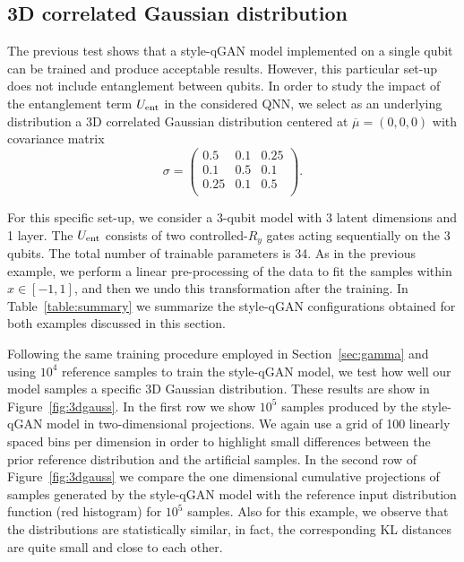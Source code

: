 \documentclass[twocolumn,preprintnumbers,superscriptaddress]{revtex4-2}
\begin{document}
\subsection{3D correlated Gaussian distribution}

The previous test shows that a style-qGAN model implemented on a single qubit can be
trained and produce acceptable results. However, this particular set-up does not
include entanglement between qubits. In order to study the impact of the
entanglement term $U_{\rm ent}$ in the considered QNN, we select as an
underlying distribution a 3D correlated Gaussian distribution centered at
$\overline{\mu}=(0,0,0)$ with covariance matrix
\begin{equation}
\label{eq:covmat}
  \sigma =
\begin{pmatrix}
  0.5 & 0.1 & 0.25\\
  0.1 & 0.5 & 0.1\\
  0.25 & 0.1 & 0.5\\
  \end{pmatrix}.
\end{equation}

For this specific set-up, we consider a 3-qubit model with 3 latent dimensions and
1 layer. The $U_{\rm ent}$ consists of two controlled-$R_{y}$ gates acting sequentially on the 3 qubits. The total number of trainable parameters is 34. As in the previous example, we perform a linear pre-processing of the data to fit the samples within $x \in [-1, 1]$, and then we undo this transformation after the training. In Table~\ref{table:summary}
we summarize the style-qGAN configurations obtained for both examples discussed in
this section.

Following the same training procedure employed in Section~\ref{sec:gamma} and using $10^4$ reference samples to train the style-qGAN model, we test how well our model samples a specific 3D Gaussian distribution. These results are show in Figure~\ref{fig:3dgauss}. In the first row we show $10^5$ samples produced by the
style-qGAN model in two-dimensional projections. We again use a
grid of 100 linearly spaced bins per dimension in order to highlight small
differences between the prior reference distribution and the artificial samples.
%
In the second row of Figure~\ref{fig:3dgauss} we compare the one dimensional
cumulative projections of samples generated by the style-qGAN model with the
reference input distribution function (red histogram) for $10^5$ samples. Also
for this example, we observe that the distributions are statistically similar,
in fact, the corresponding KL distances are quite small and close to each other.
\end{document}
